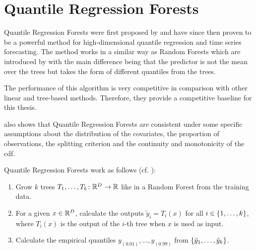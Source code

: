 \section{Quantile Regression Forests}
\label{sec:qrf}

Quantile Regression Forests were first proposed by \Textcite{Meinshausen2006}
and have since then proven to be a powerful method for high-dimensional quantile 
regression and time series forecasting. 
The method works in a similar way as Random Forests which are introduced by \Textcite{Breiman2001}
with the main difference 
being that the predictor is not the mean over the trees but takes the form of different quantiles 
from the trees.

The performance of this algorithm is very competitive in comparison with other 
linear and tree-based methods.
Therefore, they provide a competitive baseline for this thesis. 

\Textcite{Meinshausen2006} also shows that Quantile Regression Forests are consistent 
under some specific assumptions about the distribution of the covariates, the proportion of observations, the splitting criterion and the 
continuity and monotonicity of the \gls{cdf}.

Quantile Regression Forests work as follows (cf. \Textcite{Meinshausen2006}):
\begin{enumerate}
    \item Grow \(k\) trees \(T_1, \ldots, T_k\colon \mathbb{R}^D \rightarrow \mathbb{R}\) like in a Random Forest from the training data.
    \item For a given \(x\in\mathbb{R}^D\), calculate the outputs \( \tilde{y}_i = T_i(x) \) for all \(i \in \{1, \ldots, k\}\), 
    where \(T_i(x)\) is the output of the \(i\)-th tree when \(x\) is used as input.
    \item Calculate the empirical quantiles \(y_{(0.01)}, \ldots, y_{(0.99)}\) from 
    \(\{\tilde{y}_1, \ldots, \tilde{y}_k\}\).
\end{enumerate}
